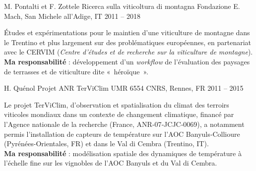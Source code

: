 \begin{cventries}
\cventry
{M. Pontalti et F. Zottele} %
{Ricerca sulla viticoltura di montagna} %
{Fondazione E. Mach, San Michele all'Adige, IT} %
{2011 -- 2018} %
{
  \begin{cvitems} %
    Études et expérimentations pour le maintien d'une viticulture de montagne dans le Trentino et plus largement sur des problématiques européennes, en partenariat avec le CERVIM (\emph{Centre d'études et de recherche sur la viticulture de montagne}).\\
    \textbf{Ma responsabilité} : développement d’un \emph{workflow} de l’évaluation des paysages de terrasses et de viticulture dite « héroïque ».
  \end{cvitems}
}

\cventry
{H. Quénol} %
{Projet ANR TerViClim} %
{UMR 6554 CNRS, Rennes, FR} %
{2011 -- 2015} %
{
  \begin{cvitems} %
    Le projet TerViClim, d’observation et spatialisation du climat des terroirs viticoles mondiaux dans un contexte de changement climatique, financé par l’Agence nationale de la recherche (France, ANR‑07‑JCJC‑0069), a notamment permis l’installation de capteurs de température sur l’AOC Banyuls‑Collioure (Pyrénées-Orientales, FR) et dans le Val di Cembra (Trentino, IT).\\
    \textbf{Ma responsabilité } : modélisation spatiale des dynamiques de température à l'échelle fine sur les vignobles de l'AOC Banyuls et du Val di Cembra.
  \end{cvitems}
}


\end{cventries}
